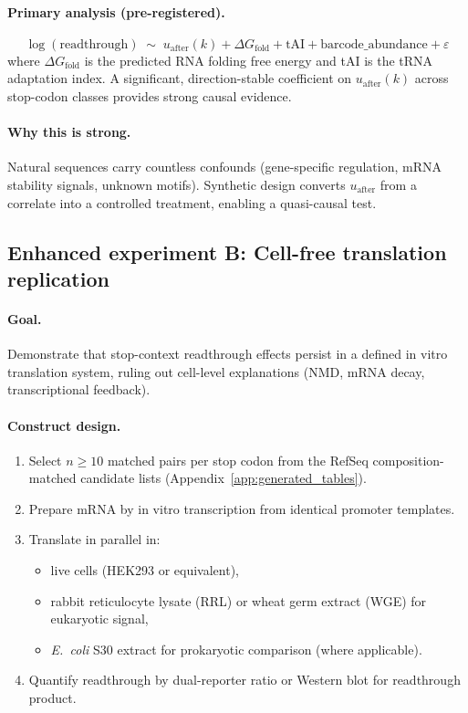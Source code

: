 \paragraph{Primary analysis (pre-registered).}
\[
\log(\text{readthrough}) \;\sim\; u_{\mathrm{after}}(k) + \Delta G_{\mathrm{fold}} + \text{tAI} + \text{barcode\_abundance} + \varepsilon
\]
where $\Delta G_{\mathrm{fold}}$ is the predicted RNA folding free energy and tAI is the tRNA adaptation index.
A significant, direction-stable coefficient on $u_{\mathrm{after}}(k)$ across stop-codon classes provides strong causal evidence.

\paragraph{Why this is strong.}
Natural sequences carry countless confounds (gene-specific regulation, mRNA stability signals, unknown motifs).
Synthetic design converts $u_{\mathrm{after}}$ from a correlate into a controlled treatment, enabling a quasi-causal test.

\subsection{Enhanced experiment B: Cell-free translation replication}
\label{app:bio_exp_b_cellfree}

\paragraph{Goal.}
Demonstrate that stop-context readthrough effects persist in a defined in vitro translation system, ruling out cell-level explanations (NMD, mRNA decay, transcriptional feedback).

\paragraph{Construct design.}
\begin{enumerate}
\item Select $n\ge 10$ matched pairs per stop codon from the RefSeq composition-matched candidate lists (Appendix~\ref{app:generated_tables}).
\item Prepare mRNA by in vitro transcription from identical promoter templates.
\item Translate in parallel in:
  \begin{itemize}
  \item live cells (HEK293 or equivalent),
  \item rabbit reticulocyte lysate (RRL) or wheat germ extract (WGE) for eukaryotic signal,
  \item \textit{E.~coli} S30 extract for prokaryotic comparison (where applicable).
  \end{itemize}
\item Quantify readthrough by dual-reporter ratio or Western blot for readthrough product.
\end{enumerate}


